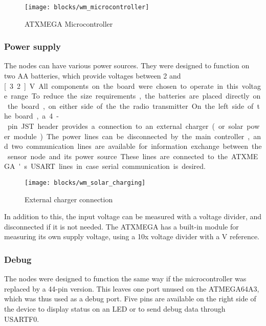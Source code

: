 \begin{figure}[htpb]
  \begin{center}
    \texttt{[image: blocks/wm\_microcontroller]}
  \end{center}
  \caption{ATXMEGA Microcontroller}
  \label{fig:microcontroller}
\end{figure}


\subsubsection{Power supply}

The nodes can have various power sources. They were designed to function on two
AA batteries, which provide voltages between 2 and \unit[3.2]{V}. All components on
the board were chosen to operate in this voltage range.

To reduce the size requirements, the batteries are placed directly on the board,
on either side of the the radio transmitter.

On the left side of the board, a 4-pin JST header provides a connection to an
external charger (or solar power module). The power lines can be disconnected by
the main controller, and two communication lines are available for information
exchange between the sensor node and its power source. These lines are connected
to the ATXMEGA's USART lines in case serial communication is desired.

\begin{figure}[h]
  \begin{center}
    \texttt{[image: blocks/wm\_solar\_charging]}
  \end{center}
  \caption{External charger connection}
  \label{fig:solar-charger}
\end{figure}

In addition to this, the input voltage can be measured with a voltage divider,
and disconnected if it is not needed. The ATXMEGA has a built-in module for
measuring its own supply voltage, using a 10x voltage divider with a \unit[1]{V}
reference.

\subsubsection{Debug}

The nodes were designed to function the same way if the microcontroller was
replaced by a 44-pin version. This leaves one port unused on the ATMEGA64A3,
which was thus used as a debug port. Five pins are available on the right side
of the device to display status on an LED or to send debug data through USARTF0.


